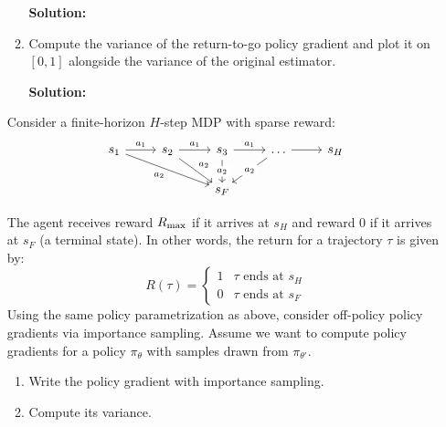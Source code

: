 \documentclass{article}
\begin{document}
\begin{enumerate}
\begin{enumerate}
\textbf{Solution:}

    \item Compute the variance of the return-to-go policy gradient and plot it on $[0, 1]$ alongside the variance of the original estimator.

\textbf{Solution:}

\end{enumerate}
\newpage
{} Consider a finite-horizon $H$-step MDP with sparse reward:
\[\begin{tikzcd}
	{s_1} & {s_2} & {s_3} & \dots & {s_H} \\
	&& {s_F}
	\arrow["{a_1}", from=1-1, to=1-2]
	\arrow["{a_1}", from=1-2, to=1-3]
	\arrow["{a_2}"', from=1-1, to=2-3]
	\arrow["{a_1}", from=1-3, to=1-4]
	\arrow[from=1-4, to=1-5]
	\arrow["{a_2}", from=1-2, to=2-3]
	\arrow["{a_2}"{description}, from=1-3, to=2-3]
	\arrow["{a_2}"{description}, from=1-4, to=2-3]
\end{tikzcd}\]

The agent receives reward $R_{\textrm{max}}$ if it arrives at $s_H$ and reward $0$ if it arrives at $s_F$ (a terminal state). In other words, the return for a trajectory $\tau$ is given by:
\[R(\tau) = \begin{cases}1 & \tau \textrm{ ends at } s_H \\ 0 & \tau \textrm{ ends at } s_F \end{cases}\]
Using the same policy parametrization as above, consider off-policy policy gradients via importance sampling. Assume we want to compute policy gradients for a policy $\pi_\theta$ with samples drawn from $\pi_{\theta'}$.
\begin{enumerate}
    \item Write the policy gradient with importance sampling.

    \item Compute its variance.

\end{enumerate}

\end{enumerate}
\end{document}
